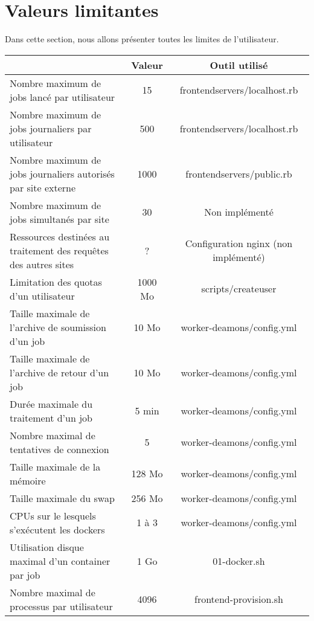 \section{Valeurs limitantes}

Dans cette section, nous allons présenter toutes les limites de l'utilisateur.


\begin{center}
	\begin{tabular}{| L{8cm} | c | c |}
		\hline
		  & {\bf Valeur} & {\bf Outil utilisé} \\ \hline
		Nombre maximum de jobs lancé par utilisateur & 15 & frontendservers/localhost.rb \\ \hline
		Nombre maximum de jobs journaliers par utilisateur & 500 & frontendservers/localhost.rb \\ \hline
		Nombre maximum de jobs journaliers autorisés par site externe & 1000 & frontendservers/public.rb \\ \hline
		Nombre maximum de jobs simultanés par site & 30 & Non implémenté \\ \hline
		Ressources destinées au traitement des requêtes des autres sites & ? & Configuration nginx (non implémenté) \\ \hline
		Limitation des quotas d'un utilisateur & 1000 Mo & scripts/createuser \\ \hline
		Taille maximale de l'archive de soumission d'un job & 10 Mo & worker-deamons/config.yml \\ \hline
		Taille maximale de l'archive de retour d'un job & 10 Mo & worker-deamons/config.yml \\ \hline
		Durée maximale du traitement d'un job & 5 min & worker-deamons/config.yml \\ \hline
		Nombre maximal de tentatives de connexion & 5 & worker-deamons/config.yml \\ \hline
		Taille maximale de la mémoire & 128 Mo & worker-deamons/config.yml \\ \hline
		Taille maximale du swap & 256 Mo & worker-deamons/config.yml \\ \hline
		CPUs sur le lesquels s'exécutent les dockers & 1 à 3 & worker-deamons/config.yml \\ \hline
		Utilisation disque maximal d'un container par job & 1 Go & 01-docker.sh \\ \hline
		Nombre maximal de processus par utilisateur & 4096 & frontend-provision.sh \\ \hline
	\end{tabular}
\end{center}
